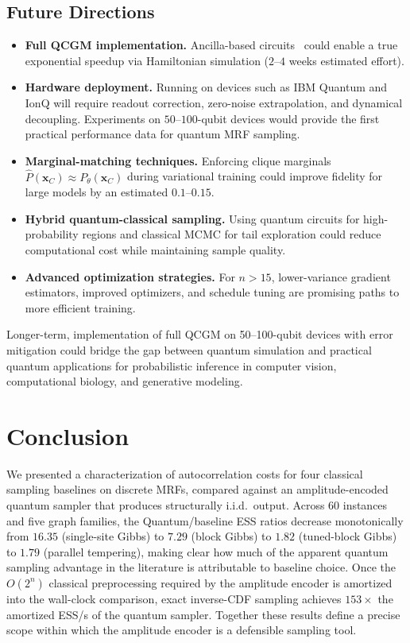 \documentclass[conference,10pt]{IEEEtran}
\begin{document}
\subsection{Future Directions}
\begin{itemize}[leftmargin=*, topsep=0pt, partopsep=0pt, itemsep=2pt, parsep=0pt]
    \item \textbf{Full QCGM implementation.} Ancilla-based circuits~\cite{piatkowski2024qcgms} could enable a true exponential speedup via Hamiltonian simulation ($2$--$4$ weeks estimated effort).
    \item \textbf{Hardware deployment.} Running on devices such as IBM Quantum and IonQ will require readout correction, zero-noise extrapolation, and dynamical decoupling. Experiments on $50$--$100$-qubit devices would provide the first practical performance data for quantum MRF sampling.
    \item \textbf{Marginal-matching techniques.} Enforcing clique marginals $\hat{P}(\mathbf{x}_C) \approx P_\theta(\mathbf{x}_C)$ during variational training could improve fidelity for large models by an estimated $0.1$--$0.15$.
    \item \textbf{Hybrid quantum-classical sampling.} Using quantum circuits for high-probability regions and classical MCMC for tail exploration could reduce computational cost while maintaining sample quality.
    \item \textbf{Advanced optimization strategies.} For $n > 15$, lower-variance gradient estimators, improved optimizers, and schedule tuning are promising paths to more efficient training.
\end{itemize}
Longer-term, implementation of full QCGM on 50--100-qubit devices with error mitigation could bridge the gap between quantum simulation and practical quantum applications for probabilistic inference in computer vision, computational biology, and generative modeling.

\section{Conclusion}

We presented a characterization of autocorrelation costs for four classical sampling baselines on discrete MRFs, compared against an amplitude-encoded quantum sampler that produces structurally i.i.d.\ output. Across 60 instances and five graph families, the Quantum/baseline ESS ratios decrease monotonically from $16.35$ (single-site Gibbs) to $7.29$ (block Gibbs) to $1.82$ (tuned-block Gibbs) to $1.79$ (parallel tempering), making clear how much of the apparent quantum sampling advantage in the literature is attributable to baseline choice. Once the $O(2^n)$ classical preprocessing required by the amplitude encoder is amortized into the wall-clock comparison, exact inverse-CDF sampling achieves $153\times$ the amortized ESS/s of the quantum sampler. Together these results define a precise scope within which the amplitude encoder is a defensible sampling tool.
\end{document}

